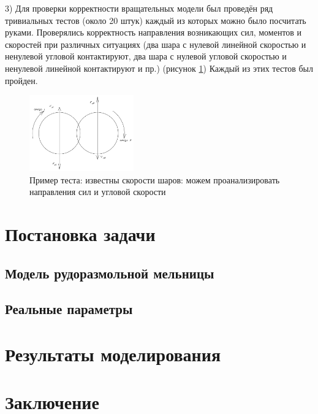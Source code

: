 \documentclass[a4paper]{article}
\begin{document}
3) Для проверки корректности вращательных модели был проведён ряд тривиальных тестов (около 20 штук) каждый из которых можно было посчитать руками. 
Проверялись корректность направления возникающих сил, моментов и скоростей при различных ситуациях (два шара с нулевой линейной скоростью и ненулевой угловой контактируют, два шара с нулевой угловой скоростью и ненулевой линейной контактируют и пр.) (рисунок \ref{pic:test_primer})
Каждый из этих тестов был пройден.

\begin{figure}[h!]
	\centering
	\includegraphics[width=0.4\textwidth]{test_primer} 
	\caption{Пример теста: известны скорости шаров: можем проанализировать направления сил и угловой скорости}
	\label{pic:test_primer}
\end{figure} 

\newpage

\section{Постановка задачи}

\subsection{Модель рудоразмольной мельницы}

\subsection{Реальные параметры}

\newpage

\section{Результаты моделирования}

\newpage

\section{Заключение}

\newpage
\end{document}
